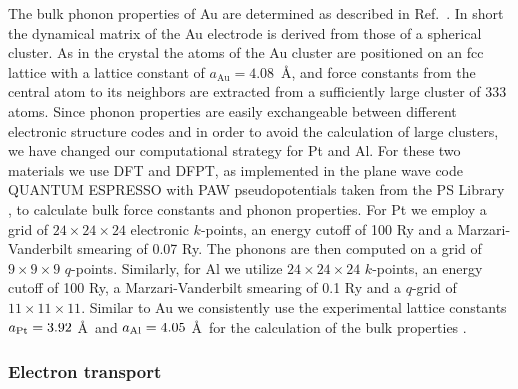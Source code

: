 \documentclass[aps,amsmath,amssymb,twocolumn,showpacs]{revtex4-1}
\begin{document}
The bulk phonon properties of Au are determined as described in
Ref.~.  In short the dynamical matrix of the Au
electrode is derived from those of a spherical cluster. As in the crystal the
atoms of the Au cluster are positioned on an fcc lattice with a lattice
constant of $a_{\text{Au}}=4.08$~\AA, and force constants from the central
atom to its neighbors are extracted from a sufficiently large cluster of 333
atoms. Since phonon properties are easily exchangeable between different
electronic structure codes and in order to avoid the calculation of large
clusters, we have changed our computational strategy for Pt and Al. For these
two materials we use DFT and DFPT, as implemented in the plane wave code
QUANTUM ESPRESSO \cite{Giannozzi2009} with PAW pseudopotentials taken from the
PS Library \cite{DalCorso2012}, to calculate bulk force
  constants and phonon properties. For Pt we employ a grid of $24 \times 24
\times 24$ electronic $k$-points, an energy cutoff of 100 Ry and a
Marzari-Vanderbilt smearing of 0.07 Ry. The phonons are then computed on a
grid of $9 \times 9 \times 9$ $q$-points. Similarly, for Al we utilize $24
\times 24 \times 24$ $k$-points, an energy cutoff of 100 Ry, a
Marzari-Vanderbilt smearing of 0.1 Ry and a $q$-grid of $11 \times 11 \times
11$. Similar to Au we consistently use the experimental lattice constants
$a_{\rm Pt} = 3.92$ \AA\ and $a_{\rm Al} = 4.05$ \AA\ for the calculation of
the bulk properties \cite{Ashcroft1976}.

\subsubsection{Electron transport}
\end{document}

